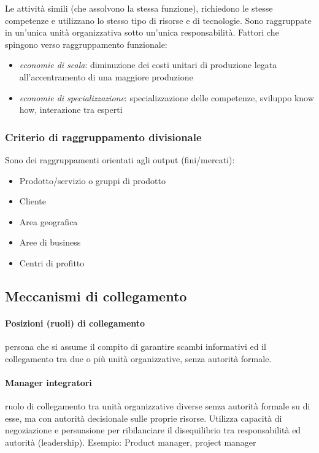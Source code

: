 Le attività simili (che assolvono la stessa funzione),
richiedono le stesse competenze e utilizzano lo stesso tipo
di risorse e di tecnologie.
Sono raggruppate in un’unica unità organizzativa sotto
un’unica responsabilità.
Fattori che spingono verso raggruppamento funzionale:
\begin{itemize}
	\item \emph{economie di scala}: diminuzione dei costi unitari di produzione legata all’accentramento di
una maggiore produzione
	\item \emph{economie di specializzazione}: specializzazione delle competenze, sviluppo know how, interazione
tra esperti
\end{itemize}

\subsubsection{Criterio di raggruppamento divisionale}
Sono dei raggruppamenti orientati agli output
(fini/mercati):
\begin{itemize}
	\item Prodotto/servizio o gruppi di prodotto
	\item Cliente
	\item Area geografica
	\item Aree di business
	\item Centri di profitto
\end{itemize}

\subsection{Meccanismi di collegamento}
\paragraph{Posizioni (ruoli) di collegamento}
persona che si assume il compito di garantire scambi informativi ed il
collegamento tra due o più unità organizzative, senza autorità formale.
\paragraph{Manager integratori}
ruolo di collegamento tra unità organizzative diverse senza autorità
formale su di esse, ma con autorità decisionale sulle proprie risorse.
Utilizza capacità di negoziazione e persuasione per ribilanciare il
disequilibrio tra responsabilità ed autorità (leadership).
Esempio:
Product manager, project manager

